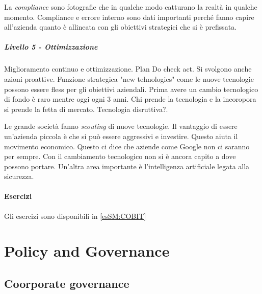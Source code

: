 

La \textit{compliance} sono fotografie che in qualche modo catturano la realtà 
in qualche momento. Compliance e errore interno sono dati importanti perché 
fanno capire all'azienda quanto è allineata con gli obiettivi strategici che si 
è prefissata.


\paragraph{Livello 5 - Ottimizzazione}

Miglioramento continuo e ottimizzazione. Plan Do check act.
Si svolgono anche azioni proattive. Funzione strategica "new tehnologies" come 
le nuove tecnologie possono essere fless per gli obiettivi aziendali. 
Prima avere un cambio tecnologico di fondo è raro mentre oggi ogni 3 anni. Chi 
prende la tecnologia e la incoropora si prende la fetta di mercato. Tecnologia 
disruttiva?.




Le grande società fanno \textit{scouting} di nuove tecnologie. Il vantaggio di 
essere un'azienda piccola è che si può essere aggressivi e investire. Questo 
aiuta il movimento economico. Questo ci dice che aziende come Google non ci 
saranno per sempre. Con il cambiamento tecnologico non si è ancora capito a dove 
possono portare. Un'altra area importante è l'intelligenza artificiale legata 
alla sicurezza.


\subsubsection{Esercizi}

Gli esercizi sono disponibili in \ref{esSM:COBIT}

\chapter{Policy and Governance}
\label{PG}

\section{Coorporate governance}

